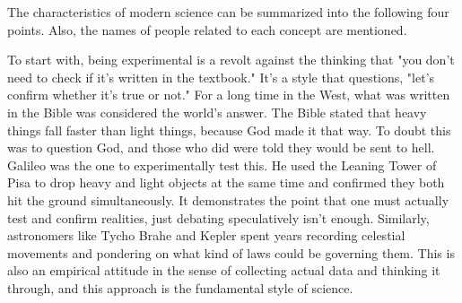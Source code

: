 \documentclass{ltjsbook}
\begin{document}
The characteristics of modern science can be summarized into the following four points. Also, the names of people related to each concept are mentioned.


To start with, being experimental is a revolt against the thinking that "you don't need to check if it's written in the textbook." It's a style that questions, "let's confirm whether it's true or not." For a long time in the West, what was written in the Bible was considered the world's answer. The Bible stated that heavy things fall faster than light things, because God made it that way. To doubt this was to question God, and those who did were told they would be sent to hell. Galileo was the one to experimentally test this. He used the Leaning Tower of Pisa to drop heavy and light objects at the same time and confirmed they both hit the ground simultaneously. It demonstrates the point that one must actually test and confirm realities, just debating speculatively isn't enough. Similarly, astronomers like Tycho Brahe and Kepler spent years recording celestial movements and pondering on what kind of laws could be governing them. This is also an empirical attitude in the sense of collecting actual data and thinking it through, and this approach is the fundamental style of science.
\end{document}
